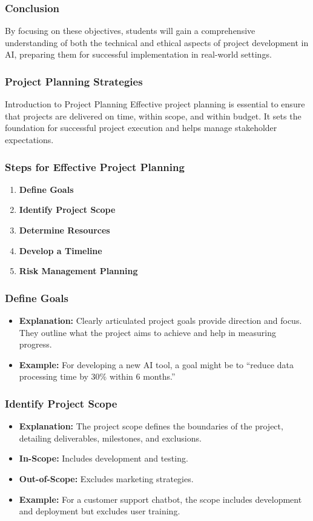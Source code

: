 \documentclass[aspectratio=169]{beamer}
\begin{document}
\begin{frame}[fragile]
    \frametitle{Conclusion}
    By focusing on these objectives, students will gain a comprehensive understanding of both the technical and ethical aspects of project development in AI, preparing them for successful implementation in real-world settings.
\end{frame}

\begin{frame}[fragile]
    \frametitle{Project Planning Strategies}
    \begin{block}{Introduction to Project Planning}
        Effective project planning is essential to ensure that projects are delivered on time, within scope, and within budget. It sets the foundation for successful project execution and helps manage stakeholder expectations.
    \end{block}
\end{frame}

\begin{frame}[fragile]
    \frametitle{Steps for Effective Project Planning}
    \begin{enumerate}
        \item \textbf{Define Goals}
        \item \textbf{Identify Project Scope}
        \item \textbf{Determine Resources}
        \item \textbf{Develop a Timeline}
        \item \textbf{Risk Management Planning}
    \end{enumerate}
\end{frame}

\begin{frame}[fragile]
    \frametitle{Define Goals}
    \begin{itemize}
        \item \textbf{Explanation:} Clearly articulated project goals provide direction and focus. They outline what the project aims to achieve and help in measuring progress.
        \item \textbf{Example:} For developing a new AI tool, a goal might be to “reduce data processing time by 30\% within 6 months.”
    \end{itemize}
\end{frame}

\begin{frame}[fragile]
    \frametitle{Identify Project Scope}
    \begin{itemize}
        \item \textbf{Explanation:} The project scope defines the boundaries of the project, detailing deliverables, milestones, and exclusions.
        \item \textbf{In-Scope:} Includes development and testing.
        \item \textbf{Out-of-Scope:} Excludes marketing strategies.
        \item \textbf{Example:} For a customer support chatbot, the scope includes development and deployment but excludes user training.
    \end{itemize}
\end{frame}
\end{document}
